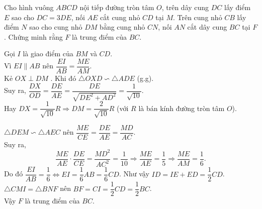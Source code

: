 \begin{ex}%
 Cho hình vuông $ABCD$ nội tiếp đường tròn tâm $O$, trên dây cung $DC$ lấy điểm $E$ sao cho $DC = 3DE$, nối $AE$ cắt cung nhỏ $CD$ tại $M$. Trên cung nhỏ $CB$ lấy điểm $N$ sao cho cung nhỏ $DM$ bằng cung nhỏ $CN$, nối $AN$ cắt dây cung $BC$ tại $F$. Chứng minh rằng $F$ là trung điểm của $BC$.
 \loigiai
  {
  \immini
  {
  Gọi $I$ là giao điểm của $BM$ và $CD$.\\
  Vì $EI \parallel AB$ nên $\dfrac{EI}{AB} = \dfrac{ME}{AM}$.\\
  Kẻ $OX \perp DM$ . Khi đó $\triangle OXD \backsim \triangle ADE$ (g.g).\\
  Suy ra, $\dfrac{DX}{OD} = \dfrac{DE}{AE} = \dfrac{DE}{\sqrt{DE^2 + AD^2}} = \dfrac{1}{\sqrt{10}}$.\\
  Hay $DX = \dfrac{1}{\sqrt{10}}R \Rightarrow DM = \dfrac{2}{\sqrt{10}}R$ (với $R$ là bán kính đường tròn tâm $O$).
  }
  {
  }
  \noindent
  $\triangle DEM \backsim \triangle AEC$ nên $\dfrac{ME}{CE} = \dfrac{DE}{AE} = \dfrac{MD}{AC}$.\\
  Suy ra, 
  $$\dfrac{ME}{AE} \cdot \dfrac{DE}{CE} = \dfrac{MD^2}{AC^2} = \dfrac{1}{10} \Rightarrow \dfrac{ME}{AE} = \dfrac{1}{5} \Rightarrow \dfrac{ME}{AM} = \dfrac{1}{6}.$$
  Do đó $\dfrac{EI}{AB} = \dfrac{1}{6} \Leftrightarrow EI = \dfrac{1}{6}AB = \dfrac{1}{6}CD$. 
  Như vậy $ID = IE + ED = \dfrac{1}{2}CD$.\\
  $\triangle CMI = \triangle BNF$ nên $BF = CI = \dfrac{1}{2}CD = \dfrac{1}{2}BC$.\\
  Vậy $F$ là trung điểm của $BC$.
  }
\end{ex}


